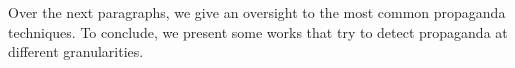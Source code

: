 Over the next paragraphs, %
we give an oversight to the most common propaganda techniques.
To conclude, we present some works that try to detect propaganda at different granularities.




